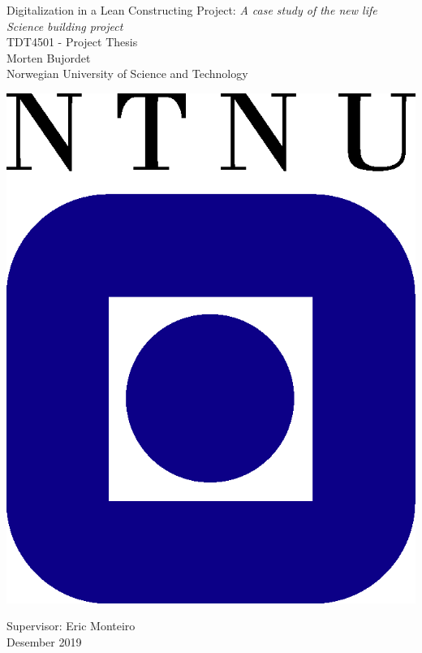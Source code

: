 \clearpage
\begin{titlepage}
    \begin{center}
    
        {\Huge Digitalization in a Lean Constructing Project:} {\Huge\textit{A case study of the new life Science building project}} \\[0.4cm]
    
        {\Large TDT4501 - Project Thesis} \\[2.0cm]
        {\Large Morten Bujordet} \\ [0.5cm]
        {\Large Norwegian University of Science and Technology}\\
    
        \vspace{3.0cm}
    
                \includegraphics{fig/ntnu-logo2.png}
    
        \vspace{3.0cm}
    
        {\Large Supervisor: Eric Monteiro} \\ [0.2cm]
        {\Large Desember 2019} \\[0.2cm]
    \end{center}
\end{titlepage}
\cleardoublepage
